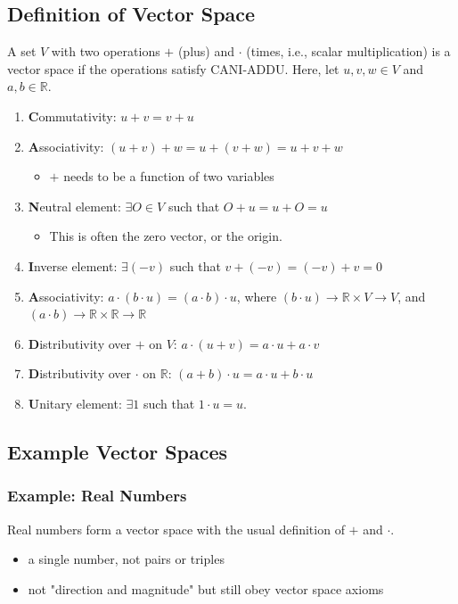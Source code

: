 \documentclass[10pt]{article}
\newcommand{\R}{\mathbb{R}}
\begin{document}
\subsection*{Definition of Vector Space}
A set $V$ with two operations $+$ (plus) and $\cdot$ (times, i.e., scalar multiplication) is a vector space if the operations satisfy CANI-ADDU.  Here, let $u, v, w \in V$ and $a, b \in \R$.
\begin{enumerate}
    \item \textbf{C}ommutativity: $u + v = v + u$ 
    \item \textbf{A}ssociativity: $(u + v) + w = u + (v + w) = u + v + w$
    \begin{itemize}
        \item $+$ needs to be a function of two variables
    \end{itemize}
    \item \textbf{N}eutral element: $\exists O \in V$ such that $O + u = u + O = u$
    \begin{itemize}
        \item This is often the zero vector, or the origin.
    \end{itemize}
    \item \textbf{I}nverse element: $\exists (-v)$ such that $v + (-v) = (-v) + v = 0$
    \item \textbf{A}ssociativity: $a \cdot (b \cdot u) = (a \cdot b) \cdot u$, where $(b \cdot u) \rightarrow \R \times V \rightarrow V$, and $(a \cdot b) \rightarrow \R \times \R \rightarrow \R$
    \item \textbf{D}istributivity over $+$ on $V$: $a \cdot (u + v) = a \cdot u + a \cdot v$
    \item \textbf{D}istributivity over $\cdot$ on $\R$: $(a + b) \cdot u = a \cdot u + b \cdot u$
    \item \textbf{U}nitary element: $\exists 1$ such that $1 \cdot u = u$.
\end{enumerate}
\subsection*{Example Vector Spaces}
\subsubsection*{Example: Real Numbers}
Real numbers form a vector space with the usual definition of $+$ and $\cdot$.
\begin{itemize}
    \item a single number, not pairs or triples
    \item not "direction and magnitude" but still obey vector space axioms
\end{itemize}
\end{document}
